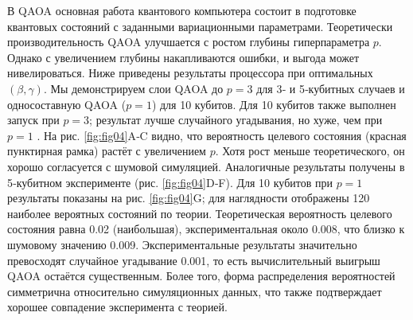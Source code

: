 В QAOA основная работа квантового компьютера состоит в подготовке квантовых
состояний с заданными вариационными параметрами. Теоретически
производительность QAOA улучшается с ростом глубины гиперпараметра $p$. Однако
с увеличением глубины накапливаются ошибки, и выгода может нивелироваться. Ниже
приведены результаты процессора при оптимальных $(\beta,\gamma)$. Мы
демонстрируем слои QAOA до $p=3$ для 3‑ и 5‑кубитных случаев и односоставную
QAOA ($p=1$) для 10 кубитов. Для 10 кубитов также выполнен запуск при $p=3$;
результат лучше случайного угадывания, но хуже, чем при $p=1$ \cite{cite_31}.
На рис. \ref{fig:fig04}A‑C видно, что вероятность целевого состояния (красная
пунктирная рамка) растёт с увеличением $p$. Хотя рост меньше теоретического, он
хорошо согласуется с шумовой симуляцией. Аналогичные результаты получены в
5‑кубитном эксперименте (рис. \ref{fig:fig04}D‑F). Для 10 кубитов при $p=1$
результаты показаны на рис. \ref{fig:fig04}G; для наглядности отображены 120
наиболее вероятных состояний по теории. Теоретическая вероятность целевого
состояния равна 0.02 (наибольшая), экспериментальная около 0.008, что близко к
шумовому значению 0.009. Экспериментальные результаты значительно превосходят
случайное угадывание 0.001, то есть вычислительный выигрыш QAOA остаётся
существенным. Более того, форма распределения вероятностей симметрична
относительно симуляционных данных, что также подтверждает хорошее совпадение
эксперимента с теорией.

